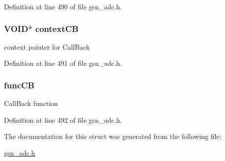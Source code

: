 Definition at line 490 of file gsn\_\-adc.h.

\hypertarget{a00025_a2898b010839acbc30fb49ec89189292c}{
\subsubsection[{contextCB}]{\setlength{\rightskip}{0pt plus 5cm}VOID$\ast$ {\bf contextCB}}}
\label{a00025_a2898b010839acbc30fb49ec89189292c}
context pointer for CallBack 

Definition at line 491 of file gsn\_\-adc.h.

\hypertarget{a00025_a3118889ff58e61fd288f912be3d653e9}{
\subsubsection[{funcCB}]{ {\bf funcCB}}}
\label{a00025_a3118889ff58e61fd288f912be3d653e9}
CallBack function 

Definition at line 492 of file gsn\_\-adc.h.



The documentation for this struct was generated from the following file:\begin{DoxyCompactItemize}
\item 
\hyperlink{a00474}{gsn\_\-adc.h}\end{DoxyCompactItemize}
